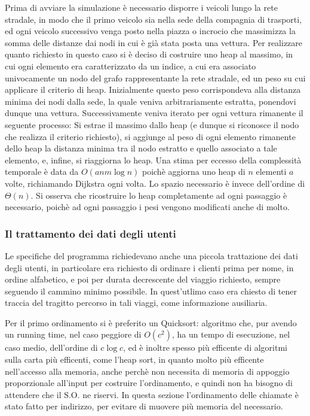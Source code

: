 \documentclass[a4paper,11pt]{Article}
\begin{document}
Prima di avviare la simulazione è necessario disporre i veicoli lungo la rete stradale, in modo che il primo veicolo sia nella sede della compagnia di trasporti, ed ogni veicolo successivo venga posto nella piazza o incrocio che massimizza la somma delle distanze dai nodi in cui è già stata posta una vettura.
Per realizzare quanto richiesto in questo caso si è deciso di costruire uno heap al massimo, in cui ogni elemento era caratterizzato da un indice, a cui era associato univocamente un nodo del grafo rappresentante la rete stradale, ed un peso su cui applicare il criterio di heap.
Inizialmente questo peso corrispondeva alla distanza minima dei nodi dalla sede, la quale veniva arbitrariamente estratta, ponendovi dunque una vettura. Successivamente veniva iterato per ogni vettura rimanente il seguente processo: Si estrae il massimo dallo heap (e dunque si riconosce il nodo che realizza il criterio richiesto), si aggiunge al peso di ogni elemento rimanente dello heap la distanza minima tra il nodo estratto e quello associato a tale elemento, e, infine, si riaggiorna lo heap.
Una stima per eccesso della complessità temporale è data da $O(anm\log{n})$ poichè aggiorna uno heap di $n$ elementi $a$ volte, richiamando Dijkstra ogni volta. Lo spazio necessario è invece dell'ordine di $\Theta(n)$.
Si osserva che ricostruire lo heap completamente ad ogni passaggio è necessario, poichè ad ogni passaggio i pesi vengono modificati anche di molto.

\subsubsection{Il trattamento dei dati degli utenti}

Le specifiche del programma richiedevano anche una piccola trattazione dei dati degli utenti, in particolare era richiesto di ordinare i clienti prima per nome, in ordine alfabetico, e poi per durata decrescente del viaggio richiesto, sempre seguendo il cammino minimo possibile. In quest'utlimo caso era chiesto di tener traccia del tragitto percorso in tali viaggi, come informazione ausiliaria.

Per il primo ordinamento si è preferito un Quicksort: algoritmo che, pur avendo un running time, nel caso peggiore di $O(c^2)$, ha un tempo di esecuzione, nel caso medio, dell'ordine di $c\log{c}$, ed è inoltre spesso più efficente di algoritmi sulla carta più efficenti, come l'heap sort, in quanto molto più efficente nell'accesso alla memoria, anche perchè non necessita di memoria di appoggio proporzionale all'input per costruire l'ordinamento, e quindi non ha bisogno di attendere che il S.O. ne riservi.
In questa sezione l'ordinamento delle chiamate è stato fatto per indirizzo, per evitare di muovere più memoria del necessario.
\end{document}
